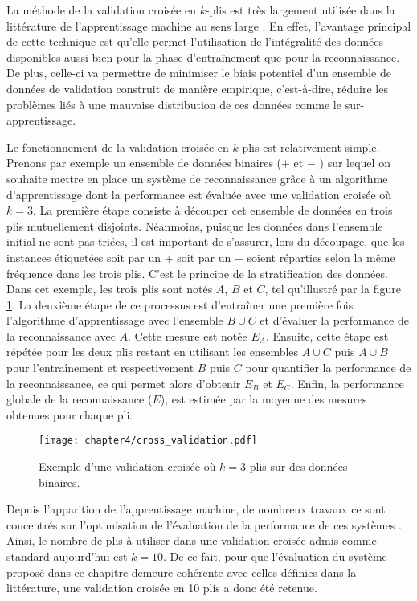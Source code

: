 La méthode de la validation croisée en $k$-plis est très largement utilisée dans la littérature de l'apprentissage machine au sens large \citep{Vail2004, Arlot2010, Kertesz2016}. En effet, l'avantage principal de cette technique est qu'elle permet l'utilisation de l'intégralité des données disponibles aussi bien pour la phase d'entraînement que pour la reconnaissance. De plus, celle-ci va permettre de minimiser le biais potentiel d'un ensemble de données de validation construit de manière empirique, c'est-à-dire, réduire les problèmes liés à une mauvaise distribution de ces données comme le sur-apprentissage.

Le fonctionnement de la validation croisée en $k$-plis est relativement simple. Prenons par exemple un ensemble de données binaires (\og $+$ \fg et \og $-$ \fg) sur lequel on souhaite mettre en place un système de reconnaissance grâce à un algorithme d'apprentissage dont la performance est évaluée avec une validation croisée où $k=3$. La première étape consiste à découper cet ensemble de données en trois plis mutuellement disjoints. Néanmoins, puisque les données dans l'ensemble initial ne sont pas triées, il est important de s'assurer, lors du découpage, que les instances étiquetées soit par un \og $+$ \fg soit par un \og $-$ \fg soient réparties selon la même fréquence dans les trois plis. C'est le principe de la stratification des données. Dans cet exemple, les trois plis sont notés $A$, $B$ et $C$, tel qu'illustré par la figure \ref{fig:cross_validation}. La deuxième étape de ce processus est d'entraîner une première fois l'algorithme d'apprentissage avec l'ensemble $B\cup C$ et d'évaluer la performance de la reconnaissance avec $A$. Cette mesure est notée $E_A$. Ensuite, cette étape est répétée pour les deux plis restant en utilisant les ensembles $A\cup C$ puis $A\cup B$ pour l'entraînement et respectivement $B$ puis $C$ pour quantifier la performance de la reconnaissance, ce qui permet alors d'obtenir $E_B$ et $E_C$. Enfin, la performance globale de la reconnaissance ($E$), est estimée par la moyenne des mesures obtenues pour chaque pli.

\begin{figure}[H]
	\centering
	\texttt{[image: chapter4/cross\_validation.pdf]}
        \caption{Exemple d'une validation croisée où $k=3$ plis sur des données binaires.}
	\label{fig:cross_validation}
\end{figure}

Depuis l'apparition de l'apprentissage machine, de nombreux travaux ce sont concentrés sur l'optimisation de l'évaluation de la performance de ces systèmes \citep{Witten2016}. Ainsi, le nombre de plis à utiliser dans une validation croisée admis comme standard aujourd'hui est $k=10$. De ce fait, pour que l'évaluation du système proposé dans ce chapitre demeure cohérente avec celles définies dans la littérature, une validation croisée en 10 plis a donc été retenue.

